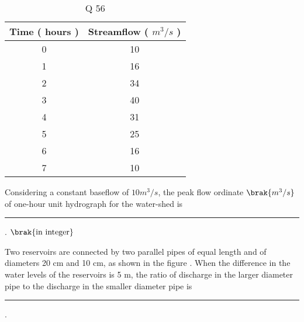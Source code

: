 		\begin{table}[h]
\centering
\caption{Q 56}
\begin{tabular}{|c|c|}
\hline
Time ( hours ) & Streamflow ( $m^3/s$ ) \\
\hline
0 & 10 \\
\hline
1 & 16 \\
\hline
2 & 34 \\
\hline
3 & 40 \\
\hline
4 & 31 \\
\hline
5 & 25 \\
\hline
6 & 16 \\
\hline 
7 & 10 \\
\hline
\end{tabular}
\label{tab: Q_56}
\end{table}
		Considering a constant baseflow of $ 10 m^3/s$, the peak flow ordinate $\brak{m^3/s}$ of one-hour unit hydrograph for the water-shed is \rule{1cm}{0.1pt}. $\brak{\text{in integer}}$
	\item Two reservoirs are connected by two parallel pipes of equal length and of diameters 20 cm and 10 cm, as shown in the  figure . When the difference in the water levels of the reservoirs is 5 m, the ratio of discharge in the larger diameter pipe to the discharge in the smaller diameter pipe is \rule{1cm}{0.1pt} .  \\
